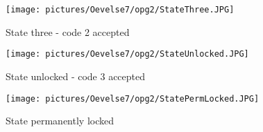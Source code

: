 \begin{enumerate}
\begin{figure}[h]
	\centering
	\texttt{[image: pictures/Oevelse7/opg2/StateThree.JPG]}
	\caption{State three - code 2 accepted}
	\label{fig:}
\end{figure}

\begin{figure}[h]
	\centering
	\texttt{[image: pictures/Oevelse7/opg2/StateUnlocked.JPG]}
	\caption{State unlocked - code 3 accepted}
	\label{fig:}
\end{figure}

\begin{figure}[h]
	\centering
	\texttt{[image: pictures/Oevelse7/opg2/StatePermLocked.JPG]}
	\caption{State permanently locked}
	\label{fig:}
\end{figure}

\end{enumerate}
	